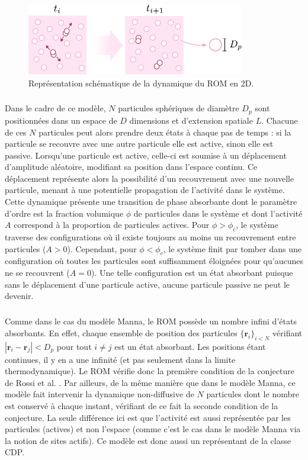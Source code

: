 \begin{figure}[h]
\centering
\includegraphics[width=0.85\textwidth]{Chapitre1/Figures/CDP/ROM.pdf}
\caption{Représentation schématique de la dynamique du ROM en 2D.}
\label{fig:ROM}
\end{figure}

\subparagraph{}Dans le cadre de ce modèle, $N$ particules sphériques de diamètre $D_p$ sont positionnées dans un espace de $D$ dimensions et d'extension spatiale $L$. Chacune de ces $N$ particules peut alors prendre deux états à chaque pas de temps : si la particule se recouvre avec une autre particule elle est active, sinon elle est passive. Lorsqu'une particule est active, celle-ci est soumise à un déplacement d'amplitude aléatoire, modifiant sa position dans l'espace continu. Ce déplacement représente alors la possibilité d'un recouvrement avec une nouvelle particule, menant à une potentielle propagation de l'activité dans le système. Cette dynamique présente une transition de phase absorbante dont le paramètre d'ordre est la fraction volumique $\phi$ de particules dans le système et dont l'activité $A$ correspond à la proportion de particules actives. Pour $\phi>\phi_c$, le système traverse des configurations où il existe toujours au moins un recouvrement entre particules ($A>0$). Cependant, pour $\phi<\phi_c$, le système finit par tomber dans une configuration où toutes les particules sont suffisamment éloignées pour qu'aucunes ne se recouvrent ($A=0$). Une telle configuration est un état absorbant puisque sans le déplacement d'une particule active, aucune particule passive ne peut le devenir. 

\subparagraph{}Comme dans le cas du modèle Manna, le ROM possède un nombre infini d'états absorbants. En effet, chaque ensemble de position des particules $\{\mathbf{r}_i\}_{i<N}$ vérifiant $|\mathbf{r}_i-\mathbf{r}_j|<D_p$ pour tout $i\neq j$ est un état absorbant. Les positions étant continues, il y en a une infinité (et pas seulement dans la limite thermodynamique). Le ROM vérifie donc la première condition de la conjecture de Rossi et al. \cite{rossi_universality_2000}. Par ailleurs, de la même manière que dans le modèle Manna, ce modèle fait intervenir la dynamique non-diffusive de $N$ particules dont le nombre est conservé à chaque instant, vérifiant de ce fait la seconde condition de la conjecture. La seule différence ici est que l'activité est aussi représentée par les particules (actives) et non l'espace (comme c'est le cas dans le modèle Manna via la notion de sites actifs). Ce modèle est donc aussi un représentant de la classe CDP.

